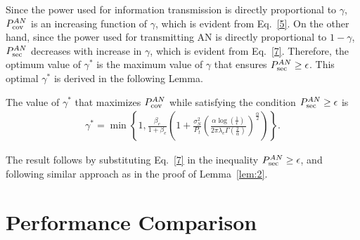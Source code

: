 \documentclass[final]{IEEEtran}
\begin{document}
Since the power used for information transmission is directly proportional to $\gamma$, $P_{\rm cov}^{AN}$ is an increasing function of $\gamma$, which is evident from Eq.~\ref{5}. On the other hand, since the power used for transmitting AN is directly proportional to $1-\gamma$, $P_{\rm sec}^{AN}$ decreases with increase in $\gamma$, which is evident from Eq.~\ref{7}. Therefore, the optimum value of $\gamma^{*}$ is the maximum value of $\gamma$ that ensures $P_{\rm sec}^{AN}\geq\epsilon$. This optimal $\gamma^{*}$ is derived in the following Lemma. 
\begin{lemma}\label{lem:3}
The value of $\gamma^{*}$ that maximizes $P_{\rm cov}^{AN}$ while satisfying the condition $P_{\rm sec}^{AN}\geq\epsilon$ is 
\begin{align}
\label{9}
\gamma^{*}=\min\left\{1,\frac{\beta_e}{1+\beta_e}\left(1+\frac{\sigma_S^2}{P_t}\left(\frac{\alpha \log\left(\frac{1}{\epsilon}\right)}{2\pi\lambda_e\Gamma(\frac{2}{\alpha})}\right)^{\frac{\alpha}{2}}\right)\right\}.
\end{align}
\end{lemma}
\begin{IEEEproof}
The result follows by substituting Eq.~\ref{7} in the inequality $P_{\rm sec}^{AN}\geq\epsilon$, and following similar approach as in the proof of Lemma~\ref{lem:2}.
\end{IEEEproof}
\vspace{-4mm} 
\section{Performance Comparison}
\end{document}
